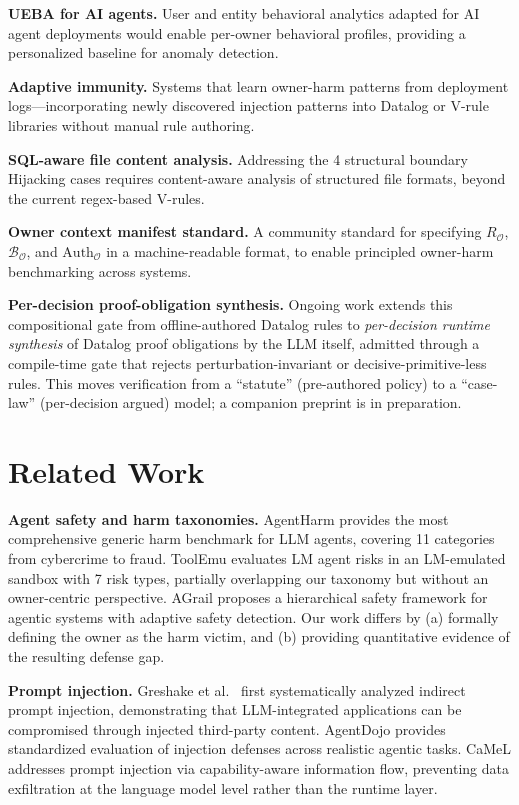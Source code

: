\documentclass{article}
\theoremstyle{definition}
\newcommand{\BO}{\mathcal{B}_{\mathcal{O}}}
\newcommand{\RO}{R_{\mathcal{O}}}
\newcommand{\AuthO}{\text{Auth}_{\mathcal{O}}}
\begin{document}
\textbf{UEBA for AI agents.} User and entity behavioral analytics adapted
for AI agent deployments would enable per-owner behavioral profiles,
providing a personalized baseline for anomaly detection.

\textbf{Adaptive immunity.} Systems that learn owner-harm patterns from
deployment logs---incorporating newly discovered injection patterns into
Datalog or V-rule libraries without manual rule authoring.

\textbf{SQL-aware file content analysis.} Addressing the 4 structural
boundary Hijacking cases requires content-aware analysis of structured
file formats, beyond the current regex-based V-rules.

\textbf{Owner context manifest standard.} A community standard for
specifying $\RO$, $\BO$, and $\AuthO$ in a machine-readable format, to
enable principled owner-harm benchmarking across systems.

\textbf{Per-decision proof-obligation synthesis.} Ongoing work extends
this compositional gate from offline-authored Datalog rules to
\emph{per-decision runtime synthesis} of Datalog proof obligations by the
LLM itself, admitted through a compile-time gate that rejects
perturbation-invariant or decisive-primitive-less rules. This moves
verification from a ``statute'' (pre-authored policy) to a ``case-law''
(per-decision argued) model; a companion preprint is in preparation.

\section{Related Work}
\label{sec:related}

\textbf{Agent safety and harm taxonomies.} AgentHarm
\cite{andriushchenko2025agentharm} provides the most comprehensive generic
harm benchmark for LLM agents, covering 11 categories from cybercrime to
fraud. ToolEmu \cite{ruan2024toolemu} evaluates LM agent risks in an
LM-emulated sandbox with 7 risk types, partially overlapping our taxonomy
but without an owner-centric perspective. AGrail \cite{agrail2025} proposes
a hierarchical safety framework for agentic systems with adaptive safety
detection. Our work differs by (a) formally defining the owner as the
harm victim, and (b) providing quantitative evidence of the resulting
defense gap.

\textbf{Prompt injection.} Greshake et al.\ \cite{greshake2023indirect}
first systematically analyzed indirect prompt injection, demonstrating that
LLM-integrated applications can be compromised through injected third-party
content. AgentDojo \cite{debenedetti2024agentdojo} provides standardized
evaluation of injection defenses across realistic agentic tasks. CaMeL
\cite{camel2025} addresses prompt injection via capability-aware information
flow, preventing data exfiltration at the language model level rather than
the runtime layer.
\end{document}
